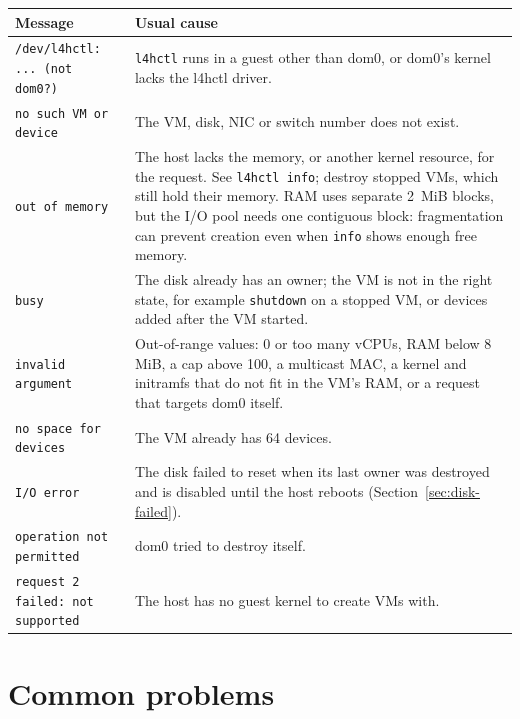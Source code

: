 \documentclass[11pt,a4paper]{report}
\newcommand{\cmd}[1]{\texttt{#1}}
\begin{document}
\begin{longtable}{@{}p{4.3cm}p{10.2cm}@{}}
\toprule
Message & Usual cause \\
\midrule
\endhead
\texttt{/dev/l4hctl: ... (not dom0?)} & \cmd{l4hctl} runs in a guest other
  than dom0, or dom0's kernel lacks the l4hctl driver. \\
\texttt{no such VM or device} & The VM, disk, NIC or switch number does not
  exist. \\
\texttt{out of memory} & The host lacks the memory, or another kernel
  resource, for the request. See \cmd{l4hctl info}; destroy stopped VMs,
  which still hold their memory. RAM uses separate 2~MiB blocks, but the
  I/O pool needs one contiguous block: fragmentation can prevent creation
  even when \cmd{info} shows enough free memory. \\
\texttt{busy} & The disk already has an owner; the VM is not in the right
  state, for example \cmd{shutdown} on a stopped VM, or devices added
  after the VM started. \\
\texttt{invalid argument} & Out-of-range values: 0 or too many vCPUs, RAM
  below 8 MiB, a cap above 100, a multicast MAC, a kernel and initramfs that do not fit in the VM's RAM, or a request
  that targets dom0 itself. \\
\texttt{no space for devices} & The VM already has 64 devices. \\
\texttt{I/O error} & The disk failed to reset when its last owner was
  destroyed and is disabled until the host reboots
  (Section~\ref{sec:disk-failed}). \\
\texttt{operation not permitted} & dom0 tried to destroy itself. \\
\texttt{request 2 failed: not supported} & The host has no guest
  kernel to create VMs with. \\
\bottomrule
\end{longtable}

\section{Common problems}
\end{document}
